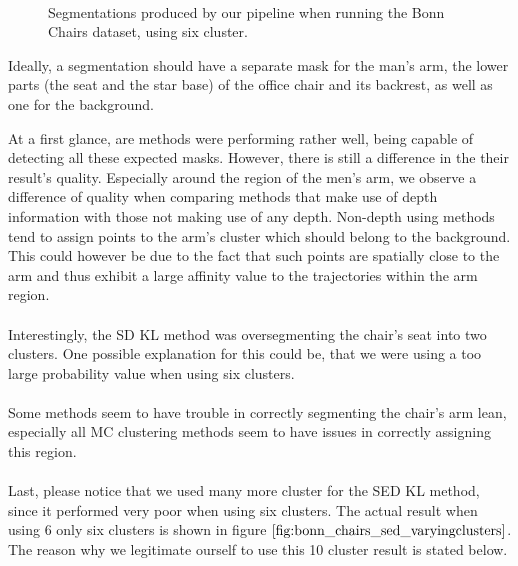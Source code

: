 \begin{figure}[H]
\begin{center}
~
~
\end{center}
\caption[Bonn Chairs Segmentations]{Segmentations produced by our pipeline when running the Bonn Chairs dataset, using six cluster.}
\label{fig:eval_bonn_chairs_raw_segmentations}
\end{figure}
Ideally, a segmentation should have a separate mask for the man's arm, the lower parts (the seat and the star base) of the office chair and its backrest, as well as one for the background.

At a first glance, are methods were performing rather well, being capable of detecting all these expected masks. However, there is still a difference in the their result's quality. Especially around the region of the men's arm, we observe a difference of quality when comparing methods that make use of depth information with those not making use of any depth. Non-depth using methods tend to assign points to the arm's cluster which should belong to the background. This could however be due to the fact that such points are spatially close to the arm and thus exhibit a large affinity value to the trajectories within the arm region. \\ \\
Interestingly, the SD KL method was oversegmenting the chair's seat into two clusters. One possible explanation for this could be, that we were using a too large probability value when using six clusters. \\ \\
Some methods seem to have trouble in correctly segmenting the chair's arm lean, especially all MC clustering methods seem to have issues in correctly assigning this region. \\ \\
Last, please notice that we used many more cluster for the SED KL method, since it performed very poor when using six clusters. The actual result when using 6 only six clusters is shown in figure $\ref{fig:bonn_chairs_sed_varyingclusters}$. The reason why we legitimate ourself to use this 10 cluster result is stated below.


